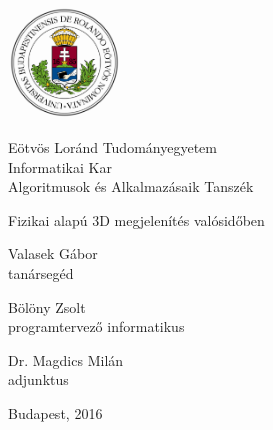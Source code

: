 \documentclass[12pt,oneside]{book}
\begin{document}

\begin{titlepage}

\noindent
\begin{minipage}{4cm}
    \includegraphics[width=3cm]{cimer_nagy_szines.png}
\end{minipage}
\hfill
\begin{minipage}[c]{8cm}
Eötvös Loránd Tudományegyetem\\
Informatikai Kar\\
Algoritmusok és Alkalmazásaik Tanszék
\end{minipage}

\vspace{5cm}

\begin{center}
\huge
Fizikai alapú 3D megjelenítés valósidőben
\end{center}

\vspace{4cm}

\noindent
\begin{minipage}[t]{7cm}
\flushleft
Valasek Gábor\\
tanársegéd
\end{minipage}
\hfill
\begin{minipage}[t]{5.2cm}
Bölöny Zsolt\\
programtervező informatikus
\end{minipage}

\vspace{1cm}

\noindent
\begin{minipage}[t]{7cm}
\flushleft
Dr. Magdics Milán\\
adjunktus
\end{minipage}

\begin{center}
Budapest, 2016
\end{center}

\end{titlepage}


\tableofcontents

\end{document}
